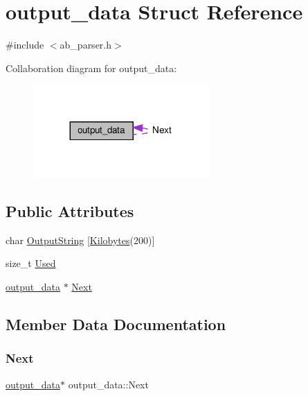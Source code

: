 \hypertarget{structoutput__data}{}\section{output\+\_\+data Struct Reference}
\label{structoutput__data}


{\ttfamily \#include $<$ab\+\_\+parser.\+h$>$}



Collaboration diagram for output\+\_\+data\+:\nopagebreak
\begin{figure}[H]
\begin{center}
\leavevmode
\includegraphics[width=191pt]{dc/d66/structoutput__data__coll__graph}
\end{center}
\end{figure}
\subsection*{Public Attributes}
\begin{DoxyCompactItemize}
\item 
char \hyperlink{structoutput__data_a4b5cddf8fc02cfb5219eafd71e3b3645}{Output\+String} \mbox{[}\hyperlink{ab__common_8h_a9e89c74d1fedd0a954107d7ab01481cc}{Kilobytes}(200)\mbox{]}
\item 
size\+\_\+t \hyperlink{structoutput__data_ac960304f0c5df1d42068abe8bb6a362a}{Used}
\item 
\hyperlink{structoutput__data}{output\+\_\+data} $\ast$ \hyperlink{structoutput__data_ab48e74baa16f37fe4f5b87faed472657}{Next}
\end{DoxyCompactItemize}


\subsection{Member Data Documentation}
\mbox{\label{structoutput__data_ab48e74baa16f37fe4f5b87faed472657}} 
\subsubsection{\texorpdfstring{Next}{Next}}
{\footnotesize\ttfamily \hyperlink{structoutput__data}{output\+\_\+data}$\ast$ output\+\_\+data\+::\+Next}

